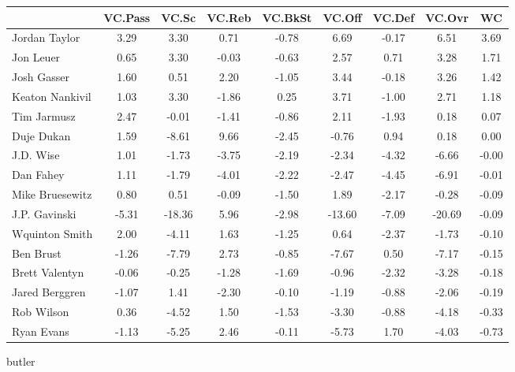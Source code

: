 \documentclass[10pt,letterpaper]{article}
\begin{document}
\begin{table}[ht]
\begin{center}
\begin{tabular}{lcccccccc}
  \hline
 & VC.Pass & VC.Sc & VC.Reb & VC.BkSt & VC.Off & VC.Def & VC.Ovr & WC \\ 
  \hline
Jordan Taylor & 3.29 & 3.30 & 0.71 & -0.78 & 6.69 & -0.17 & 6.51 & 3.69 \\ 
  Jon Leuer & 0.65 & 3.30 & -0.03 & -0.63 & 2.57 & 0.71 & 3.28 & 1.71 \\ 
  Josh Gasser & 1.60 & 0.51 & 2.20 & -1.05 & 3.44 & -0.18 & 3.26 & 1.42 \\ 
  Keaton Nankivil & 1.03 & 3.30 & -1.86 & 0.25 & 3.71 & -1.00 & 2.71 & 1.18 \\ 
  Tim Jarmusz & 2.47 & -0.01 & -1.41 & -0.86 & 2.11 & -1.93 & 0.18 & 0.07 \\ 
  Duje Dukan & 1.59 & -8.61 & 9.66 & -2.45 & -0.76 & 0.94 & 0.18 & 0.00 \\ 
  J.D. Wise & 1.01 & -1.73 & -3.75 & -2.19 & -2.34 & -4.32 & -6.66 & -0.00 \\ 
  Dan Fahey & 1.11 & -1.79 & -4.01 & -2.22 & -2.47 & -4.45 & -6.91 & -0.01 \\ 
  Mike Bruesewitz & 0.80 & 0.51 & -0.09 & -1.50 & 1.89 & -2.17 & -0.28 & -0.09 \\ 
  J.P. Gavinski & -5.31 & -18.36 & 5.96 & -2.98 & -13.60 & -7.09 & -20.69 & -0.09 \\ 
  Wquinton Smith & 2.00 & -4.11 & 1.63 & -1.25 & 0.64 & -2.37 & -1.73 & -0.10 \\ 
  Ben Brust & -1.26 & -7.79 & 2.73 & -0.85 & -7.67 & 0.50 & -7.17 & -0.15 \\ 
  Brett Valentyn & -0.06 & -0.25 & -1.28 & -1.69 & -0.96 & -2.32 & -3.28 & -0.18 \\ 
  Jared Berggren & -1.07 & 1.41 & -2.30 & -0.10 & -1.19 & -0.88 & -2.06 & -0.19 \\ 
  Rob Wilson & 0.36 & -4.52 & 1.50 & -1.53 & -3.30 & -0.88 & -4.18 & -0.33 \\ 
  Ryan Evans & -1.13 & -5.25 & 2.46 & -0.11 & -5.73 & 1.70 & -4.03 & -0.73 \\ 
   \hline
\end{tabular}
\end{center}
\end{table}
\newpage
\begin{center}
butler 
\end{center}
\end{document}
